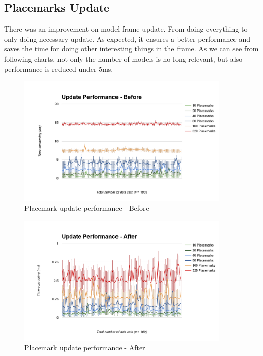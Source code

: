 \subsection{Placemarks Update}
\label{section:placemarks-update}

There was an improvement on model frame update. From doing everything to only doing necessary update. As expected, it ensures a better performance and saves the time for doing other interesting things in the frame. As we can see from following charts, not only the number of models is no long relevant, but also performance is reduced under $5$ms.

\begin{figure}[H]
	\caption{Placemark update performance - Before}
	\label{fig:placemark-update-performance-before}
	\centering
	\includegraphics[width=0.9\textwidth, keepaspectratio]{Figures/placemark-update-performance-before.png}
	\decoRule
\end{figure}

\begin{figure}[H]
	\caption{Placemark update performance - After}
	\label{fig:placemark-update-performance-after}
	\centering
	\includegraphics[width=0.9\textwidth, keepaspectratio]{Figures/placemark-update-performance-after.png}
	\decoRule
\end{figure}

